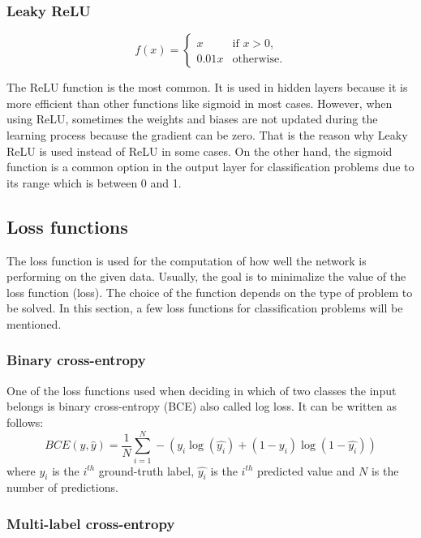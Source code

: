 \documentclass[thesis=B,english]{FITthesis}[2019/12/23]
\begin{document}
\subsubsection*{Leaky ReLU}
\begin{equation}
    f(x) = 
    \begin{cases}
        x & \text{if } x > 0, \\
        0.01x & \text{otherwise}.
    \end{cases}
\end{equation}

The ReLU function is the most common. It is used in hidden layers because it is more efficient than other functions like sigmoid in most cases. However, when using ReLU, sometimes the weights and biases are not updated during the learning process because the gradient can be zero. That is the reason why Leaky ReLU is used instead of ReLU in some cases. On the other hand, the sigmoid function is a common option in the output layer for classification problems due to its range which is between 0 and 1.\cite{act_fnc_2020}

\subsection{Loss functions}

The loss function is used for the computation of how well the network is performing on the given data. Usually, the goal is to minimalize the value of the loss function (loss). The choice of the function depends on the type of problem to be solved. In this section, a few loss functions for classification problems will be mentioned.

\subsubsection*{Binary cross-entropy}
One of the loss functions used when deciding in which of two classes the input belongs is binary cross-entropy (BCE) also called log loss. It can be written as follows:
$$
BCE(y, \hat{y}) = \dfrac{1}{N} \sum_{i=1}^{N} -(y_i\log(\hat{y_i}) + (1 - y_i)\log(1 - \hat{y_i}))
$$
where $y_i$ is the $i^{th}$ ground-truth label, $\hat{y_i}$ is the $i^{th}$ predicted value and $N$ is the number of predictions.

\subsubsection*{Multi-label cross-entropy}
\end{document}
